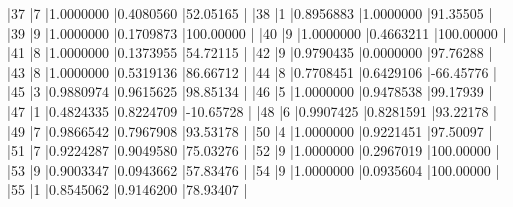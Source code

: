 \documentclass{article}
\begin{document}
\begin{Schunk}
\begin{Soutput}
|37        |7  |1.0000000  |0.4080560 |52.05165   |
|38        |1  |0.8956883  |1.0000000 |91.35505   |
|39        |9  |1.0000000  |0.1709873 |100.00000  |
|40        |9  |1.0000000  |0.4663211 |100.00000  |
|41        |8  |1.0000000  |0.1373955 |54.72115   |
|42        |9  |0.9790435  |0.0000000 |97.76288   |
|43        |8  |1.0000000  |0.5319136 |86.66712   |
|44        |8  |0.7708451  |0.6429106 |-66.45776  |
|45        |3  |0.9880974  |0.9615625 |98.85134   |
|46        |5  |1.0000000  |0.9478538 |99.17939   |
|47        |1  |0.4824335  |0.8224709 |-10.65728  |
|48        |6  |0.9907425  |0.8281591 |93.22178   |
|49        |7  |0.9866542  |0.7967908 |93.53178   |
|50        |4  |1.0000000  |0.9221451 |97.50097   |
|51        |7  |0.9224287  |0.9049580 |75.03276   |
|52        |9  |1.0000000  |0.2967019 |100.00000  |
|53        |9  |0.9003347  |0.0943662 |57.83476   |
|54        |9  |1.0000000  |0.0935604 |100.00000  |
|55        |1  |0.8545062  |0.9146200 |78.93407   |
\end{Soutput}
\end{Schunk}
\end{document}
